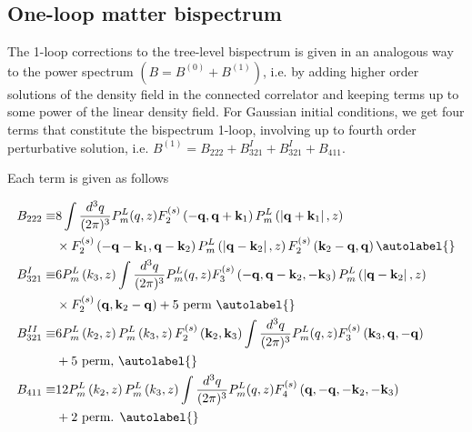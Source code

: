 \subsection{One-loop matter bispectrum}
The 1-loop corrections to the tree-level bispectrum is given in an analogous way to the power spectrum $\left(B=B^{(0)}+B^{(1)}\right)$, i.e. by adding higher order solutions of the density field in the connected correlator and keeping terms up to some power of the linear density field. For Gaussian initial conditions, we get four terms that constitute the bispectrum 1-loop, involving up to fourth order perturbative solution, i.e. $B^{(1)}=B_{222}+B_{321}^{I}+B_{321}^{I}+B_{411}$.

Each term is given as follows \cite{Scoccimarro_1997,Scoccimarro_1999,Bernardeau_2002}


\begin{align*}
    B_{222} \equiv & 8 \int \frac{d^{3} q}{(2 \pi)^{3}} P_{m}^{L}(q, z) F_{2}^{(s)}\left(-\mathbf{q}, \mathbf{q}+\mathbf{k}_{1}\right) P_{m}^{L}\left(\left|\mathbf{q}+\mathbf{k}_{1}\right|, z\right) \\
    & \times F_{2}^{(s)}\left(-\mathbf{q}-\mathbf{k}_{1}, \mathbf{q}-\mathbf{k}_{2}\right) P_{m}^{L}\left(\left|\mathbf{q}-\mathbf{k}_{2}\right|, z\right) F_{2}^{(s)}\left(\mathbf{k}_{2}-\mathbf{q}, \mathbf{q}\right)  \autolabel{}\\
    B_{321}^{I} \equiv & 6 P_{m}^{L}\left(k_{3}, z\right) \int \frac{d^{3} q}{(2 \pi)^{3}} P_{m}^{L}(q, z) F_{3}^{(s)}\left(-\mathbf{q}, \mathbf{q}-\mathbf{k}_{2},-\mathbf{k}_{3}\right) P_{m}^{L}\left(\left|\mathbf{q}-\mathbf{k}_{2}\right|, z\right) \\
    & \times F_{2}^{(s)}\left(\mathbf{q}, \mathbf{k}_{2}-\mathbf{q}\right)+5 \text { perm }  \autolabel{}\\
    B_{321}^{I I} \equiv & 6 P_{m}^{L}\left(k_{2}, z\right) P_{m}^{L}\left(k_{3}, z\right) F_{2}^{(s)}\left(\mathbf{k}_{2}, \mathbf{k}_{3}\right) \int \frac{d^{3} q}{(2 \pi)^{3}} P_{m}^{L}(q, z) F_{3}^{(s)}\left(\mathbf{k}_{3}, \mathbf{q},-\mathbf{q}\right) \\
    & +5 \text { perm, }  \autolabel{}\\
    B_{411} \equiv & 12 P_{m}^{L}\left(k_{2}, z\right) P_{m}^{L}\left(k_{3}, z\right) \int \frac{d^{3} q}{(2 \pi)^{3}} P_{m}^{L}(q, z) F_{4}^{(s)}\left(\mathbf{q},-\mathbf{q},-\mathbf{k}_{2},-\mathbf{k}_{3}\right) \\
    & +2 \text { perm. } \autolabel{}
\end{align*}


